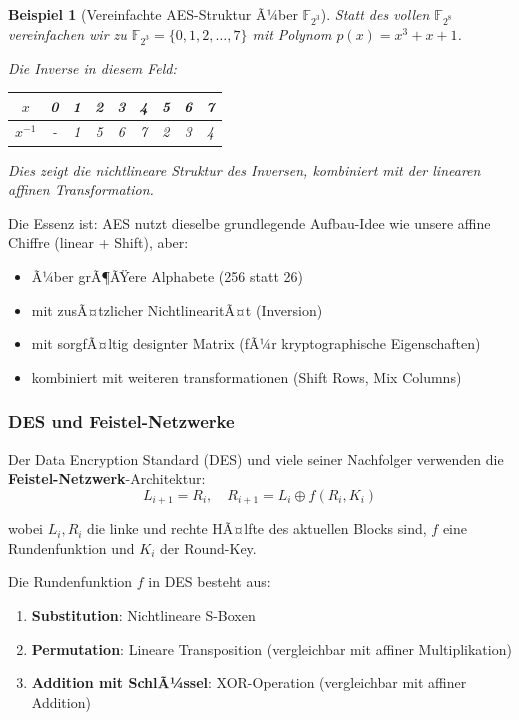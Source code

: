 ﻿\documentclass[12pt,a4paper]{article}
\newtheorem{example}{Beispiel}
\begin{document}
	\begin{example}[Vereinfachte AES-Struktur Ã¼ber $\mathbb{F}_{2^3}$]
		Statt des vollen $\mathbb{F}_{2^8}$ vereinfachen wir zu $\mathbb{F}_{2^3} = \{0,1,2,\ldots,7\}$ mit Polynom $p(x) = x^3 + x + 1$.
		
		Die Inverse in diesem Feld:
		\begin{center}
			\small
			\begin{tabular}{|c|c|c|c|c|c|c|c|c|}
				\hline
				$x$ & 0 & 1 & 2 & 3 & 4 & 5 & 6 & 7 \\
				\hline
				$x^{-1}$ & - & 1 & 5 & 6 & 7 & 2 & 3 & 4 \\
				\hline
			\end{tabular}
		\end{center}
		
		Dies zeigt die nichtlineare Struktur des Inversen, kombiniert mit der linearen affinen Transformation.
	\end{example}
	
	Die Essenz ist: AES nutzt dieselbe grundlegende Aufbau-Idee wie unsere affine Chiffre (linear + Shift), aber:
	\begin{itemize}
		\item Ã¼ber grÃ¶ÃŸere Alphabete (256 statt 26)
		\item mit zusÃ¤tzlicher NichtlinearitÃ¤t (Inversion)
		\item mit sorgfÃ¤ltig designter Matrix (fÃ¼r kryptographische Eigenschaften)
		\item kombiniert mit weiteren transformationen (Shift Rows, Mix Columns)
	\end{itemize}
	
	\subsubsection{DES und Feistel-Netzwerke}
	
	Der Data Encryption Standard (DES) und viele seiner Nachfolger verwenden die \textbf{Feistel-Netzwerk}-Architektur:
	\begin{equation}
		L_{i+1} = R_i, \quad R_{i+1} = L_i \oplus f(R_i, K_i)
	\end{equation}
	
	wobei $L_i, R_i$ die linke und rechte HÃ¤lfte des aktuellen Blocks sind, $f$ eine Rundenfunktion und $K_i$ der Round-Key.
	
	Die Rundenfunktion $f$ in DES besteht aus:
	\begin{enumerate}
		\item \textbf{Substitution}: Nichtlineare S-Boxen
		\item \textbf{Permutation}: Lineare Transposition (vergleichbar mit affiner Multiplikation)
		\item \textbf{Addition mit SchlÃ¼ssel}: XOR-Operation (vergleichbar mit affiner Addition)
	\end{enumerate}
	
\end{document}
